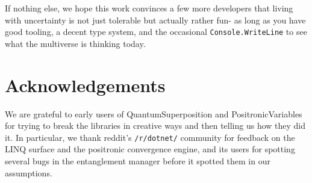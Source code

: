 \documentclass[a4paper,11pt]{article}
\begin{document}
If nothing else, we hope this work convinces a few more developers that
living with uncertainty is not just tolerable but actually rather fun-
as long as you have good tooling, a decent type system, and the
occasional \texttt{Console.WriteLine} to see what the multiverse is
thinking today.

\section{Acknowledgements}

We are grateful to early users of QuantumSuperposition and
PositronicVariables for trying to break the libraries in creative ways
and then telling us how they did it. In particular, we thank reddit’s
\texttt{/r/dotnet/} community for feedback on the LINQ surface and the
positronic convergence engine, and its users for spotting several bugs
in the entanglement manager before it spotted them in our assumptions.

\printbibliography
\end{document}
